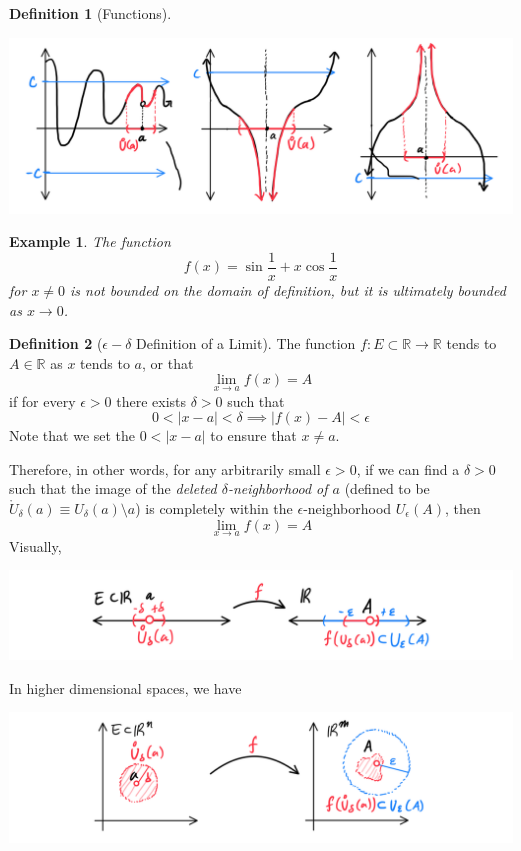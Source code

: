 \documentclass{article}
\newtheorem{example}{Example}[section]
\theoremstyle{remark}
\theoremstyle{definition}
\newtheorem{definition}{Definition}[section]
\begin{document}
\begin{definition}[Functions]
\begin{enumerate}
    \begin{center}
        \includegraphics[scale=0.25]{img/Ultimately_Bounded_Three.PNG}
    \end{center}
\end{enumerate}
\end{definition}

\begin{example}
The function 
\[f(x) = \sin{\frac{1}{x}} + x \cos{\frac{1}{x}}\]
for $x \neq 0$ is not bounded on the domain of definition, but it is ultimately bounded as $x \rightarrow 0$. 

\end{example}

\begin{definition}[$\epsilon-\delta$ Definition of a Limit]
The function $f: E \subset \mathbb{R} \longrightarrow \mathbb{R}$ tends to $A \in \mathbb{R}$ as $x$ tends to $a$, or that 
\[\lim_{x \rightarrow a} f(x) = A\]
if for every $\epsilon > 0$ there exists $\delta > 0$ such that 
\[0<|x - a|<\delta \implies |f(x) - A| < \epsilon\]
Note that we set the $0<|x-a|$ to ensure that $x \neq a$. 

Therefore, in other words, for any arbitrarily small $\epsilon > 0$, if we can find a $\delta > 0$ such that the image of the \textit{deleted $\delta$-neighborhood of $a$} (defined to be $\mathring{U}_\delta (a) \equiv U_\delta (a) \setminus a$) is completely within the $\epsilon$-neighborhood $U_\epsilon (A)$, then 
\[\lim_{x \rightarrow a} f(x) = A\]
Visually, 
\begin{center}
    \includegraphics[scale=0.3]{img/Limit_of_Function_on_R.PNG}
\end{center}
In higher dimensional spaces, we have 
\begin{center}
    \includegraphics[scale=0.3]{img/Limit_of_Function_on_Euclidean_Space.PNG}
\end{center}
\end{definition}
\end{document}
